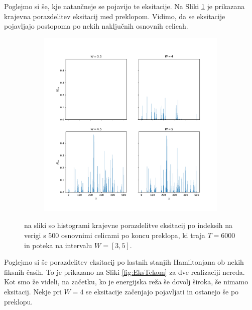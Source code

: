 Poglejmo si še, kje natančneje se pojavijo te eksitacije. Na Sliki \ref{fig:Krajevne} je prikazana krajevna porazdelitev eksitacij med preklopom. Vidimo, da se eksitacije pojavljajo postopoma po nekih naključnih osnovnih celicah.
\begin{figure}[H]
\centering
\begin{subfigure}{.99\textwidth}
\includegraphics[width=\linewidth]{Figures/KrajevneEksitacijeNoGrid.pdf}
\end{subfigure}
\caption{na sliki so histogrami krajevne porazdelitve eksitacij po indeksih na verigi s $500$ osnovnimi celicami po koncu preklopa, ki traja $T=6000$ in poteka na intervalu $W=[3,5]$.}
\label{fig:Krajevne}
\end{figure}

Poglejmo si še porazdelitev eksitacij po lastnih stanjih Hamiltonjana ob nekih fiksnih časih. To je prikazano na Sliki \ref{fig:EksTekom} za dve realizaciji nereda. Kot smo že videli, na začetku, ko je energijska reža še dovolj široka, še nimamo eksitacij. Nekje pri $W=4$ se eksitacije začenjajo pojavljati in ostanejo še po preklopu. 

